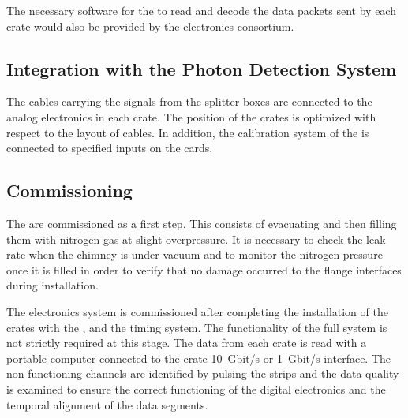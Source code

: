 The necessary software for the  to read and decode the data packets sent by each  crate would also be provided by the electronics consortium.  

\subsection{Integration with the Photon Detection System}
\label{ssec:dp-tpcelec-install-pmt}

The cables carrying the  signals from the splitter boxes are connected to the  analog electronics in each  crate. The position of the crates is optimized with respect to the layout of  cables. In addition, the calibration system of the  is connected to specified inputs on the cards.


\subsection{Commissioning}
\label{ssec:dp-tpcelec-install-comission}

The  are commissioned as a first step. This consists of evacuating and then filling them with nitrogen gas at slight overpressure. It is necessary to check the leak rate when the chimney is under vacuum and to monitor the nitrogen pressure once it is filled in order to verify that no damage occurred to the flange interfaces during installation.

The electronics system is commissioned after completing the installation of the  crates with the , and the timing system. The functionality of the full  system is not strictly required at this stage. The data from each crate is read with a portable computer connected to the crate  \SI{10}{Gbit/s} or \SI{1}{Gbit/s} interface. The non-functioning channels are identified by pulsing the  strips and the data quality is examined to ensure the correct functioning of the digital electronics and the temporal alignment of the data segments.   
